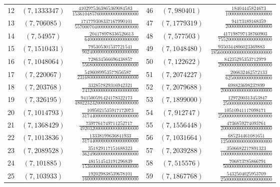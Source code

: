 \documentclass[11pt]{article}
\theoremstyle{remark}
\numberwithin{equation}{section}
\begin{document}
\begin{longtable}{rcr@{\qquad}rcr}
12 & $(7,1333347)$ & $\frac{4102975363865369084583}{153610485760000000000000000}$ & 46 & $(7,980401)$ & $\frac{18404445824673}{1000000000000000000}$\\[2pt]
13 & $(7,706085)$ & $\frac{171779308337167990101}{55700070400000000000000000}$ & 47 & $(7,1779319)$ & $\frac{94173189168359}{2000000000000000000}$\\[2pt]
14 & $(7,54957)$ & $\frac{204178978336526613}{6400000000000000000000}$ & 48 & $(7,577503)$ & $\frac{417198797138760903}{7552000000000000000000}$\\[2pt]
15 & $(7,1510431)$ & $\frac{795305301537721541}{90240000000000000000000}$ & 49 & $(7,1048480)$ & $\frac{9350344806023369883}{1856000000000000000000000}$\\[2pt]
16 & $(7,1048064)$ & $\frac{728634566696438857}{55680000000000000000000}$ & 50 & $(7,122622)$ & $\frac{84235295353712979}{2900000000000000000000}$\\[2pt]
17 & $(7,220067)$ & $\frac{5496089953577656587}{2316800000000000000000000}$ & 51 & $(7,2074227)$ & $\frac{206632462572133}{6250000000000000000}$\\[2pt]
18 & $(7,203768)$ & $\frac{332857829316942321}{24320000000000000000000}$ & 52 & $(7,2079688)$ & $\frac{698823698237899}{200000000000000000000}$\\[2pt]
19 & $(7,326195)$ & $\frac{941500591424178322173}{48022323200000000000000000}$ & 53 & $(7,1899000)$ & $\frac{1297200313453847}{25000000000000000000}$\\[2pt]
20 & $(7,1014793)$ & $\frac{1095021535917172073}{31744000000000000000000}$ & 54 & $(7,912747)$ & $\frac{10510941117098171}{2500000000000000000000}$\\[2pt]
21 & $(7,1368429)$ & $\frac{7397761749711252717}{492032000000000000000000}$ & 55 & $(7,1556448)$ & $\frac{4736859274093761}{200000000000000000000}$\\[2pt]
22 & $(7,1013836)$ & $\frac{13338199636841933}{31744000000000000000000}$ & 56 & $(7,1031664)$ & $\frac{685234461081651}{125000000000000000000}$\\[2pt]
23 & $(7,2089528)$ & $\frac{351829117151688323}{36249600000000000000000}$ & 57 & $(7,2039288)$ & $\frac{3506682217891323}{100000000000000000000}$\\[2pt]
24 & $(7,101885)$ & $\frac{481514543191296839}{15360000000000000000000}$ & 58 & $(7,515576)$ & $\frac{706873785866791}{50000000000000000000}$\\[2pt]
25 & $(7,103933)$ & $\frac{192029838539678101}{16000000000000000000000}$ & 59 & $(7,1867768)$ & $\frac{5432504025953709}{250000000000000000000}$\\[2pt]

\end{longtable}
\end{document}

